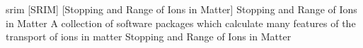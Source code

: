 \newglsXsoftware%
{srim}%
[SRIM]%
[Stopping and Range of Ions in Matter]%
{Stopping and Range of Ions in Matter}%
{A collection of software packages which calculate many features of the transport of ions in matter \cite{website:SRIM}}%
{Stopping and Range of Ions in Matter}%